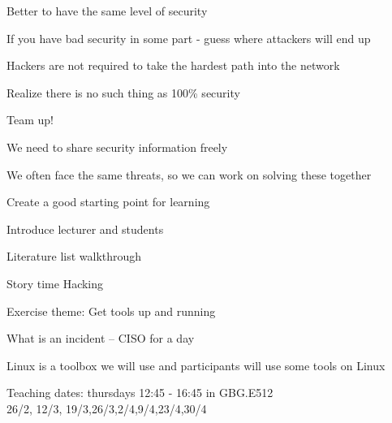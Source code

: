 \documentclass[Screen16to9,17pt]{foils}
\begin{document}


\begin{list1}
\item Better to have the same level of security
\item If you have bad security in some part - guess where attackers will end up
\item Hackers are not required to take the hardest path into the network
\item Realize there is no such thing as 100\% security
\end{list1}





\begin{list1}
\item Team up!
\item We need to share security information freely
\item We often face the same threats, so we can work on solving these together
\end{list1}



\begin{list2}
\item Create a good starting point for learning
\item Introduce lecturer and students
\item Literature list walkthrough
\item Story time Hacking
\end{list2}

Exercise theme: Get tools up and running
\begin{list2}
\item What is an incident -- CISO for a day
\end{list2}

Linux is a toolbox we will use and participants will use some tools on Linux




Teaching dates: thursdays 12:45 - 16:45 in GBG.E512\\
26/2, 12/3, 19/3,26/3,2/4,9/4,23/4,30/4
\end{document}
